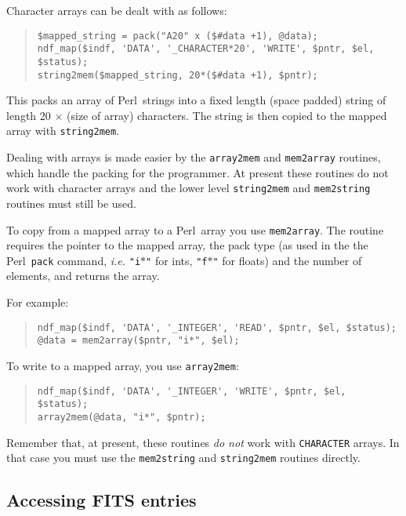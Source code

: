 \documentclass[twoside,11pt]{article}
\newenvironment{myquote}{\begin{quote}\begin{small}}{\end{small}\end{quote}}
\newcommand{\perl}{\xref{\textsf{Perl}}{sun193}{}}
\newcommand{\xref}[3]{#1}
\newcommand{\xlabel}[1]{}
\renewcommand{\_}{\texttt{\symbol{95}}}
\begin{document}
Character arrays can be dealt with as follows:

\begin{myquote}
\begin{verbatim}
$mapped_string = pack("A20" x ($#data +1), @data);
ndf_map($indf, 'DATA', '_CHARACTER*20', 'WRITE', $pntr, $el, $status);
string2mem($mapped_string, 20*($#data +1), $pntr);
\end{verbatim}
\end{myquote}

This packs an array of \perl\ strings into a fixed length (space padded) string
of length 20 $\times$ (size of array) characters. The string is then copied to
the mapped array with \texttt{string2mem}.

Dealing with arrays is made easier by the \texttt{array2mem} and
\texttt{mem2array}  routines, which handle the packing for the
programmer. At present these routines do not work with character arrays
and the lower level \texttt{string2mem} and \texttt{mem2string}
routines must still be used.

To copy from a mapped array to a \perl\ array you use \texttt{mem2array}.
The routine requires the pointer to the mapped array, the pack type (as
used in the the \perl\ \texttt{pack} command, \emph{i.e.}
\texttt{"i$\ast$"} for ints, \texttt{"f$\ast$"} for floats) and the
number of elements, and returns the array.

For example:
\begin{myquote}
\begin{verbatim}
ndf_map($indf, 'DATA', '_INTEGER', 'READ', $pntr, $el, $status);
@data = mem2array($pntr, "i*", $el);
\end{verbatim}
\end{myquote}

To write to a mapped array, you use \texttt{array2mem}:

\begin{myquote}
\begin{verbatim}
ndf_map($indf, 'DATA', '_INTEGER', 'WRITE', $pntr, $el, $status);
array2mem(@data, "i*", $pntr);
\end{verbatim}
\end{myquote}

Remember that, at present, these routines \emph{do not\/} work with
\texttt{\_CHARACTER} arrays. In that case you must use the
\texttt{mem2string} and \texttt{string2mem} routines directly.

\subsection{\xlabel{accessing_fits_entries}Accessing FITS entries}%
\label{accessing_fits_entries}
\end{document}
